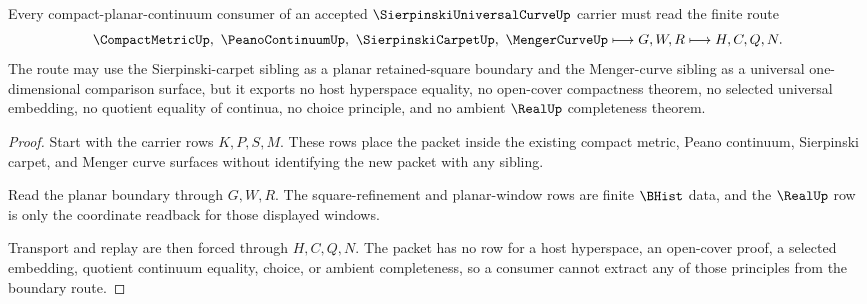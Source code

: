 \begin{theorem}
\label{thm:sierpinski-universal-curve-planar-curve-boundary}
Every compact-planar-continuum consumer of an accepted $\SierpinskiUniversalCurveUp$ carrier must read the finite route
$$
\CompactMetricUp,\ \PeanoContinuumUp,\ \SierpinskiCarpetUp,\ \MengerCurveUp
\longmapsto
G,W,R
\longmapsto
H,C,Q,N .
$$
The route may use the Sierpinski-carpet sibling as a planar retained-square boundary and the Menger-curve sibling as a universal one-dimensional comparison surface, but it exports no host hyperspace equality, no open-cover compactness theorem, no selected universal embedding, no quotient equality of continua, no choice principle, and no ambient $\RealUp$ completeness theorem.
\end{theorem}
\begin{proof}
Start with the carrier rows $K,P,S,M$. These rows place the packet inside the existing compact metric, Peano continuum, Sierpinski carpet, and Menger curve surfaces without identifying the new packet with any sibling.

Read the planar boundary through $G,W,R$. The square-refinement and planar-window rows are finite $\BHist$ data, and the $\RealUp$ row is only the coordinate readback for those displayed windows.

Transport and replay are then forced through $H,C,Q,N$. The packet has no row for a host hyperspace, an open-cover proof, a selected embedding, quotient continuum equality, choice, or ambient completeness, so a consumer cannot extract any of those principles from the boundary route.
\end{proof}



